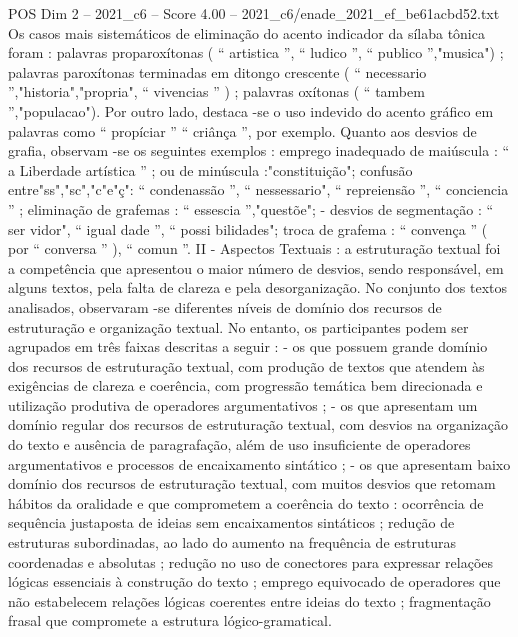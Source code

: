 \begin{textsample}{POS Dim 2 – 2021\_c6 – Score 4.00 – 2021\_c6/enade\_2021\_ef\_be61acbd52.txt}
Os casos mais sistemáticos de eliminação do acento indicador da sílaba tônica foram : palavras proparoxítonas ( “ artistica ”, “ ludico ”, “ publico ”,"musica") ; palavras paroxítonas terminadas em ditongo crescente ( “ necessario ”,"historia","propria", “ vivencias ” ) ; palavras oxítonas ( “ tambem ”,"populacao").
Por outro lado, destaca -se o uso indevido do acento gráfico em palavras como “ propíciar ” “ criânça ”, por exemplo.
Quanto aos desvios de grafia, observam -se os seguintes exemplos : emprego inadequado de maiúscula : “ a Liberdade artística ” ; ou de minúscula :"constituição"; confusão entre"ss","sc","c"e"ç": “ condenassão ”, “ nessessario", “ repreiensão ”, “ conciencia ” ; eliminação de grafemas : “ essescia ”,"questõe"; - desvios de segmentação : “ ser vidor", “ igual dade ”, “ possi bilidades"; troca de grafema : “ convença ” ( por “ conversa ” ), “ comun ”.
II - Aspectos Textuais : a estruturação textual foi a competência que apresentou o maior número de desvios, sendo responsável, em alguns textos, pela falta de clareza e pela desorganização.
No conjunto dos textos analisados, observaram -se diferentes níveis de domínio dos recursos de estruturação e organização textual.
No entanto, os participantes podem ser agrupados em três faixas descritas a seguir : - os que possuem grande domínio dos recursos de estruturação textual, com produção de textos que atendem às exigências de clareza e coerência, com progressão temática bem direcionada e utilização produtiva de operadores argumentativos ; - os que apresentam um domínio regular dos recursos de estruturação textual, com desvios na organização do texto e ausência de paragrafação, além de uso insuficiente de operadores argumentativos e processos de encaixamento sintático ; - os que apresentam baixo domínio dos recursos de estruturação textual, com muitos desvios que retomam hábitos da oralidade e que comprometem a coerência do texto : ocorrência de sequência justaposta de ideias sem encaixamentos sintáticos ; redução de estruturas subordinadas, ao lado do aumento na frequência de estruturas coordenadas e absolutas ; redução no uso de conectores para expressar relações lógicas essenciais à construção do texto ; emprego equivocado de operadores que não estabelecem relações lógicas coerentes entre ideias do texto ; fragmentação frasal que compromete a estrutura lógico-gramatical.

\end{textsample}

